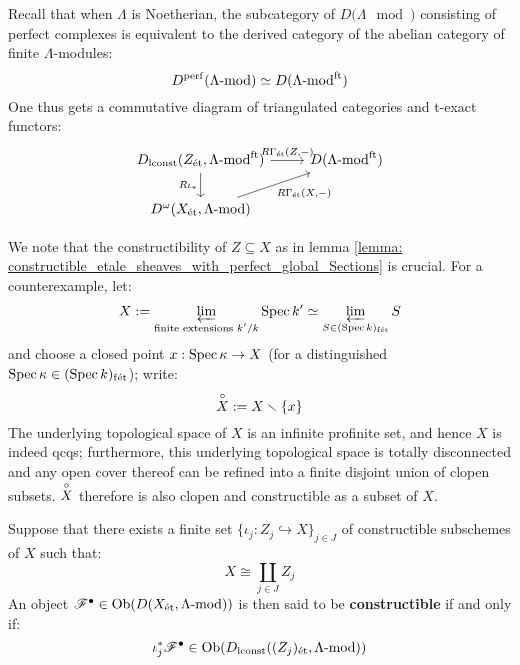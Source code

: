         \begin{remark}
            Recall that when $\Lambda$ is Noetherian, the subcategory of $D(\Lambda\mod)$ consisting of perfect complexes is equivalent to the derived category of the abelian category of finite $\Lambda$-modules:
                $$D^{\mathrm{perf}}(\Lambda\text{-}\mathrm{mod}) \simeq D(\Lambda\text{-}\mathrm{mod}^{\mathrm{ft}})$$
            One thus gets a commutative diagram of triangulated categories and t-exact functors:
                $$
                    \begin{tikzcd}
                    {D_{\locallyconstant}(Z_{\et}, \Lambda\mod^{\ft})} & {D(\Lambda\mod^{\ft})} \\
                    {D^{\omega}(X_{\et}, \Lambda\mod)}
                    \arrow["{R\iota_*}"', from=1-1, to=2-1]
                    \arrow["{R\Gamma_{\et}(Z, -)}", from=1-1, to=1-2]
                    \arrow["{R\Gamma_{\et}(X, -)}"', from=2-1, to=1-2]
                    \end{tikzcd}
                $$
        \end{remark}
        \begin{example}
            We note that the constructibility of $Z \subseteq X$ as in lemma \ref{lemma: constructible_etale_sheaves_with_perfect_global_Sections} is crucial. For a counterexample, let:
                $$X := \varprojlim_{\text{finite extensions $k'/k$}} \operatorname{Spec} k' \simeq \varprojlim_{S \in (\operatorname{Spec} k)_{\mathrm{f\acute{e}t}}} S$$
            and choose a closed point $x: \operatorname{Spec} \kappa \to X$ (for a distinguished $\operatorname{Spec} \kappa \in (\operatorname{Spec} k)_{\mathrm{f\acute{e}t}}$); write:
                $$\overset{\circ}{X} := X \smallsetminus \{x\}$$
            The underlying topological space of $X$ is an infinite profinite set, and hence $X$ is indeed qcqs; furthermore, this underlying topological space is totally disconnected and any open cover thereof can be refined into a finite disjoint union of clopen subsets. $\overset{\circ}{X}$ therefore is also clopen and constructible as a subset of $X$.
        \end{example}
        \begin{definition} \label{def: constructible_etale_sheaves}
            Suppose that there exists a finite set $\{\iota_j: Z_j \hookrightarrow X\}_{j \in J}$ of constructible subschemes of $X$ such that:
                $$X \cong \coprod_{j \in J} Z_j$$
            An object $\mathscr{F}^{\bullet} \in \mathrm{Ob}( D(X_{\mathrm{\acute{e}t}}, \Lambda\text{-}\mathrm{mod}) )$ is then said to be \textbf{constructible} if and only if:
                $$\iota_j^*\mathscr{F}^{\bullet} \in \mathrm{Ob}( D_{\mathrm{lconst}}((Z_j)_{\mathrm{\acute{e}t}}, \Lambda\text{-}\mathrm{mod}) )$$
        \end{definition}
